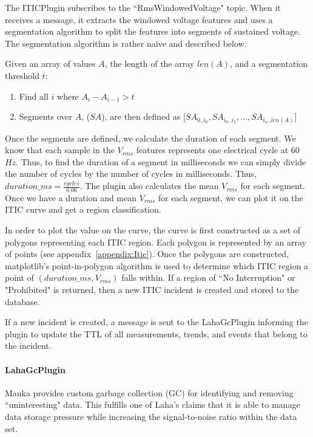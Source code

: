 The ITICPlugin subscribes to the ``RmsWindowedVoltage" topic. When it receives a message, it extracts the windowed voltage features and uses a segmentation algorithm to split the features into segments of sustained voltage. The segmentation algorithm is rather naive and described below.

Given an array of values $A$, the length of the array $len(A)$, and a segmentation threshold $t$:
\begin{enumerate}
	\item Find all $i$ where $A_i - A_{i-1} > t$
	\item Segments over $A$, ($SA$), are then defined as [$SA_{0..i_0}, SA_{i_0..i_1}, \dots, SA_{i_n..len(A)}$]
\end{enumerate}

Once the segments are defined, we calculate the duration of each segment. We know that each sample in the $V_{rms}$ features represents one electrical cycle at 60$Hz$. Thus, to find the duration of a segment in milliseconds we can simply divide the number of cycles by the number of cycles in milliseconds. Thus, $duration\_ms = \frac{cycles}{0.06}$. The plugin also calculates the mean $V_{rms}$ for each segment. Once we have a duration and mean $V_{rms}$ for each segment, we can plot it on the ITIC curve and get a region classification.

In order to plot the value on the curve, the curve is first constructed as a set of polygons representing each ITIC region. Each polygon is represented by an array of points (see appendix~\ref{appendix:Itic}). Once the polygons are constructed, matplotlib's point-in-polygon algorithm is used to determine which ITIC region a point of $(duration\_ms, V_{rms})$ falls within. If a region of ``No Interruption" or "Prohibited" is returned, then a new ITIC incident is created and stored to the database.

If a new incident is created, a message is sent to the LahaGcPlugin informing the plugin to update the TTL of all measurements, trends, and events that belong to the incident.

\paragraph{LahaGcPlugin}\label{sec:gc_plugin}
Mauka provides custom garbage collection (GC) for identifying and removing ``uninteresting" data. This fulfills one of Laha's claims that it is able to manage data storage pressure while increasing the signal-to-noise ratio within the data set.

